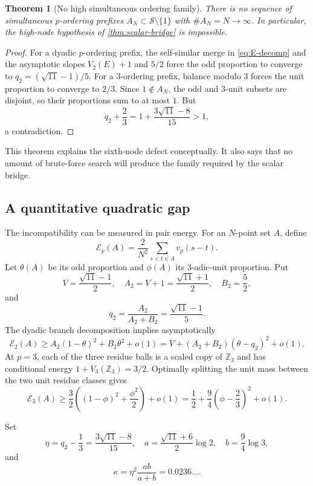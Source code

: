 \documentclass[11pt]{article}
\newtheorem{theorem}{Theorem}[section]
\theoremstyle{definition}
\theoremstyle{remark}
\newcommand{\Z}{\mathbb Z}
\newcommand{\calS}{\mathcal S}
\newcommand{\calE}{\mathcal E}
\begin{document}
\begin{theorem}[No high simultaneous ordering family]\label{thm:no-high-simultaneous}
There is no sequence of simultaneous $p$-ordering prefixes $A_N\subset\calS\setminus\{1\}$ with $\#A_N=N\to\infty$.
In particular, the high-node hypothesis of \cref{thm:scalar-bridge} is impossible.
\end{theorem}
\begin{proof}
For a dyadic $p$-ordering prefix, the self-similar merge in \eqref{eq:E-decomp} and the asymptotic slopes $V_2(E)+1$ and $5/2$ force the odd proportion to converge to
$q_2=(\sqrt{11}-1)/5$.  For a $3$-ordering prefix, balance modulo $3$ forces the unit proportion to converge to $2/3$.  Since $1\notin A_N$, the odd and $3$-unit subsets are disjoint, so their proportions sum to at most $1$.  But
\[
       q_2+\frac23
       =1+\frac{3\sqrt{11}-8}{15}>1,
\]
a contradiction.
\end{proof}

This theorem explains the sixth-node defect conceptually.  It also says that no amount of brute-force search will produce the family required by the scalar bridge.

\subsection{A quantitative quadratic gap}
The incompatibility can be measured in pair energy.  For an $N$-point set $A$, define
\[
   \calE_p(A)=\frac2{N^2}\sum_{s<t\in A}v_p(s-t).
\]
Let $\theta(A)$ be its odd proportion and $\phi(A)$ its $3$-adic-unit proportion.  Put
\[
   V=\frac{\sqrt{11}-1}{2},\quad
   A_2=V+1=\frac{\sqrt{11}+1}{2},\quad
   B_2=\frac52,
\]
and
\[
   q_2=\frac{A_2}{A_2+B_2}=\frac{\sqrt{11}-1}{5}.
\]
The dyadic branch decomposition implies asymptotically
\begin{equation}\label{eq:E2mass}
 \calE_2(A)\ge A_2(1-\theta)^2+B_2\theta^2+o(1)
 =V+(A_2+B_2)(\theta-q_2)^2+o(1).
\end{equation}
At $p=3$, each of the three residue balls is a scaled copy of $\Z_3$ and has conditional energy $1+V_3(\Z_3)=3/2$.  Optimally splitting the unit mass between the two unit residue classes gives
\begin{equation}\label{eq:E3mass}
 \calE_3(A)\ge\frac32\left((1-\phi)^2+\frac{\phi^2}{2}\right)+o(1)
 =\frac12+\frac94\left(\phi-\frac23\right)^2+o(1).
\end{equation}

Set
\[
 \eta=q_2-\frac13=\frac{3\sqrt{11}-8}{15},
 \quad
 a=\frac{\sqrt{11}+6}{2}\log2,
 \quad
 b=\frac94\log3,
\]
and
\begin{equation}\label{eq:kappa}
       \kappa=\eta^2\frac{ab}{a+b}=0.0236\ldots.
\end{equation}
\end{document}
